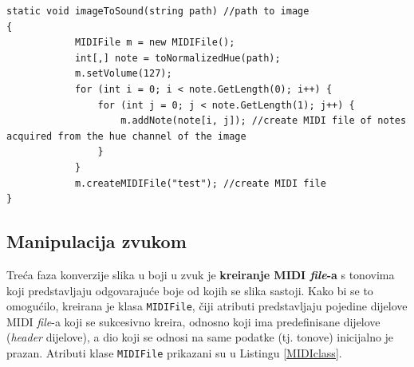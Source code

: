 \documentclass[12pt,a4paper]{article}
\begin{document}
\begin{lstlisting}[language={[Sharp]C}, caption={Funkcija \texttt{imageToSound} za kreiranje audio \textit{file}-a}, label={image2}]
static void imageToSound(string path) //path to image
{
            MIDIFile m = new MIDIFile();
            int[,] note = toNormalizedHue(path);
            m.setVolume(127);
            for (int i = 0; i < note.GetLength(0); i++) {
                for (int j = 0; j < note.GetLength(1); j++) {
                    m.addNote(note[i, j]); //create MIDI file of notes acquired from the hue channel of the image
                }
            }
            m.createMIDIFile("test"); //create MIDI file
}
\end{lstlisting}

\newpage

\subsection{Manipulacija zvukom}

Treća faza konverzije slika u boji u zvuk je \textbf{kreiranje MIDI \textit{file}-a} s tonovima koji predstavljaju odgovarajuće boje od kojih se slika sastoji. Kako bi se to omogućilo, kreirana je klasa \texttt{MIDIFile}, čiji atributi predstavljaju pojedine dijelove MIDI \textit{file}-a koji se sukcesivno kreira, odnosno koji ima predefinisane dijelove (\textit{header} dijelove), a dio koji se odnosi na same podatke (tj. tonove) inicijalno je prazan. Atributi klase \texttt{MIDIFile} prikazani su u Listingu \ref{MIDIclass}.
\end{document}
